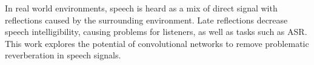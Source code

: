 In real world environments, speech is heard as a mix of direct signal with reflections caused by the surrounding environment. Late reflections decrease speech intelligibility, causing problems for listeners, as well as tasks such as \ac{ASR}. This work explores the potential of convolutional networks to remove problematic reverberation in speech signals.
